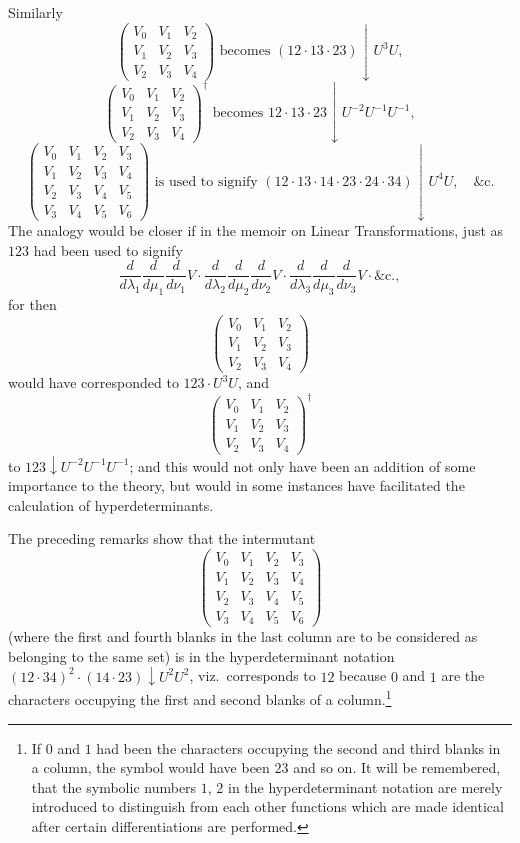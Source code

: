 \documentclass[11pt,a4paper]{book}
\begin{document}
Similarly
\[\begin{pmatrix} V_0 & V_1 & V_2 \\ V_1 & V_2 & V_3 \\ V_2 & V_3 & V_4 \end{pmatrix} \text{ becomes } (12 \cdot 13 \cdot 23)\downarrow U^3 U,\]
\[\begin{pmatrix} V_0 & V_1 & V_2 \\ V_1 & V_2 & V_3 \\ V_2 & V_3 & V_4 \end{pmatrix}^{\dagger} \text{ becomes } 12 \cdot 13 \cdot 23\downarrow U^{-2} U^{-1} U^{-1},\]
\[\begin{pmatrix} V_0 & V_1 & V_2 & V_3 \\ V_1 & V_2 & V_3 & V_4 \\ V_2 & V_3 & V_4 & V_5 \\ V_3 & V_4 & V_5 & V_6 \end{pmatrix} \text{ is used to signify } (12 \cdot 13 \cdot 14 \cdot 23 \cdot 24 \cdot 34)\downarrow U^4 U, \quad \&\text{c.}\]
The analogy would be closer if in the memoir on Linear Transformations, just as $123$ had been used to signify
\[\frac{d}{d\lambda_1}\frac{d}{d\mu_1}\frac{d}{d\nu_1}V \cdot \frac{d}{d\lambda_2}\frac{d}{d\mu_2}\frac{d}{d\nu_2}V \cdot \frac{d}{d\lambda_3}\frac{d}{d\mu_3}\frac{d}{d\nu_3}V \cdot \&\text{c.},\]
for then
\[\begin{pmatrix} V_0 & V_1 & V_2 \\ V_1 & V_2 & V_3 \\ V_2 & V_3 & V_4 \end{pmatrix}\]
would have corresponded to $123 \cdot U^3 U$, and
\[\begin{pmatrix} V_0 & V_1 & V_2 \\ V_1 & V_2 & V_3 \\ V_2 & V_3 & V_4 \end{pmatrix}^{\dagger}\]
to $123\downarrow U^{-2} U^{-1} U^{-1}$; and this would not only have been an addition of some importance to the theory, but would in some instances have facilitated the calculation of hyperdeterminants.

The preceding remarks show that the intermutant
\[\begin{pmatrix} V_0 & V_1 & V_2 & V_3 \\ V_1 & V_2 & V_3 & V_4 \\ V_2 & V_3 & V_4 & V_5 \\ V_3 & V_4 & V_5 & V_6 \end{pmatrix}\]
(where the first and fourth blanks in the last column are to be considered as belonging to the same set) is in the hyperdeterminant notation $(12 \cdot 34)^2 \cdot (14 \cdot 23)\downarrow U^2 U^2$, viz.\ corresponds to $12$ because $0$ and $1$ are the characters occupying the first and second blanks of a column.\footnote{If $0$ and $1$ had been the characters occupying the second and third blanks in a column, the symbol would have been $23$ and so on. It will be remembered, that the symbolic numbers $1$, $2$ in the hyperdeterminant notation are merely introduced to distinguish from each other functions which are made identical after certain differentiations are performed.}
\end{document}
